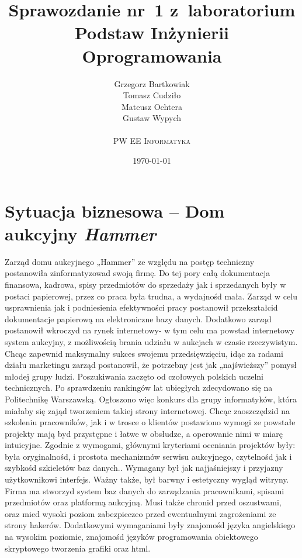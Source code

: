 \documentclass[10pt,a4paper]{article}
\begin{document}
\title{
  Sprawozdanie nr~1 z~laboratorium\\Podstaw Inżynierii Oprogramowania
}
\author{
  Grzegorz Bartkowiak\\
  Tomasz Cudziło\\
  Mateusz Ochtera\\
  Gustaw Wypych\\
  \\
  \textsc{PW EE Informatyka}\\[10pt]
}
\date{\today}

\maketitle

\section{Sytuacja biznesowa -- Dom aukcyjny \emph{Hammer}}
Zarząd domu aukcyjnego „Hammer” ze względu na postęp techniczny postanowiła
zinformatyzowad swoją firmę. Do tej pory całą dokumentacja finansowa, kadrowa,
spisy przedmiotów do sprzedaży jak i sprzedanych były w postaci papierowej,
przez co praca była trudna, a wydajnośd mała. Zarząd w celu usprawnienia jak i
podniesienia efektywności pracy postanowił przekształcid dokumentacje papierową
na elektroniczne bazy danych. Dodatkowo zarząd postanowił wkroczyd na rynek
internetowy- w tym celu ma powstad internetowy system aukcyjny, z możliwością
brania udziału w aukcjach w czasie rzeczywistym. Chcąc zapewnid maksymalny
sukces swojemu przedsięwzięciu, idąc za radami działu marketingu zarząd
postanowił, że potrzebny jest jak „najświeższy” pomysł młodej grupy ludzi.
Poszukiwania zaczęto od czołowych polskich uczelni technicznych. Po sprawdzeniu
rankingów lat ubiegłych zdecydowano się na Politechnikę Warszawską. Ogłoszono
więc konkurs dla grupy informatyków, która miałaby się zająd tworzeniem takiej
strony internetowej. Chcąc zaoszczędzid na szkoleniu pracowników, jak i w
trosce o klientów postawiono wymogi ze powstałe projekty mają byd przystępne i
łatwe w obsłudze, a operowanie nimi w miarę intuicyjne. Zgodnie z wymogami,
głównymi kryteriami oceniania projektów były: była oryginalnośd, i prostota
mechanizmów serwisu aukcyjnego, czytelnośd jak i	szybkośd	szkieletów baz
danych.. Wymagany był jak najjaśniejszy i przyjazny użytkownikowi interfejs.
Ważny także, był barwny i estetyczny wygląd witryny. Firma ma stworzyd system
baz danych do zarządzania pracownikami, spisami przedmiotów oraz platformą
aukcyjną. Musi także chronid przed oszustwami, oraz mied wysoki poziom
zabezpieczeo przed ewentualnymi zagrożeniami ze strony hakerów. Dodatkowymi
wymaganiami były znajomośd języka angielskiego na wysokim poziomie, znajomośd
języków programowania obiektowego	skryptowego tworzenia grafiki oraz html.
\end{document}
